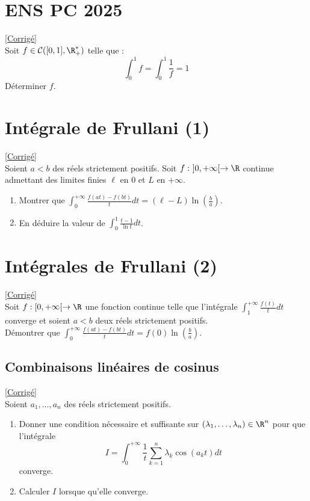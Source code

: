 \documentclass{book}
\begin{document}
	\section{ENS PC 2025 }
	\textcolor{blue}{\hyperref[ENS PC 2025 corrigé]{[Corrigé]}}\\
	\label{ENS PC 2025}
	Soit $f\in \mathcal C([0,1],\R^*_+)$ telle que : $$\int_0^1f=\int_0^1\frac{1}{f}=1$$
	Déterminer $f$.
	
	\section{Intégrale de Frullani (1) }
	\textcolor{blue}{\hyperref[Intégrales de Frullani (1) corrigé]{[Corrigé]}}\\
	\label{Intégrales de Frullani (1)}
	Soient $a<b$ des réels strictement positifs. Soit $f:\ ]0,+\infty[\to \R$ continue admettant des limites finies $\ell$ en $0$ et $L$ en $+\infty$.
	\begin{enumerate}
		\item Montrer que $\displaystyle\int_0^{+\infty}\frac{f(at)-f(bt)}{t}dt=(\ell-L)\ln\left(\frac{b}{a}\right)$.
		\item En déduire la valeur de $\displaystyle\int_0^1\frac{t-1}{\ln t}dt$.
	\end{enumerate}
	
	\section{Intégrales de Frullani (2) }
	\textcolor{blue}{\hyperref[Intégrales de Frullani (2) corrigé]{[Corrigé]}}\\
	\label{Intégrales de Frullani (2)}
	Soit $f:[0,+\infty[ \to \R$ une fonction continue telle que l'intégrale $\displaystyle\int_1^{+\infty} \frac{f(t)}{t}dt$ converge et soient $a<b$ deux réels strictement positifs.
	\\Démontrer que $\displaystyle\int_0^{+\infty} \frac{f(at)-f(bt)}{t}dt=f(0)\ln\left(\frac{b}{a}\right)$.
	
	\subsection{Combinaisons linéaires de cosinus }
	\textcolor{blue}{\hyperref[Combinaisons linéaires de cosinus corrigé]{[Corrigé]}}\\
	\label{Combinaisons linéaires de cosinus}
	Soient $a_1,\dots,a_n$ des réels strictement positifs.
	\begin{enumerate}
		\item Donner une condition nécessaire et suffisante sur $(\lambda_1,\dots,\lambda_n)\in \R^n$ pour que l'intégrale
		$$I=\int_0^{+\infty}\frac{1}{t}\sum_{k=1}^n\lambda_k\cos(a_kt)dt$$
		converge.
		\item Calculer $I$ lorsque qu'elle converge.
	\end{enumerate}
	
\end{document}
